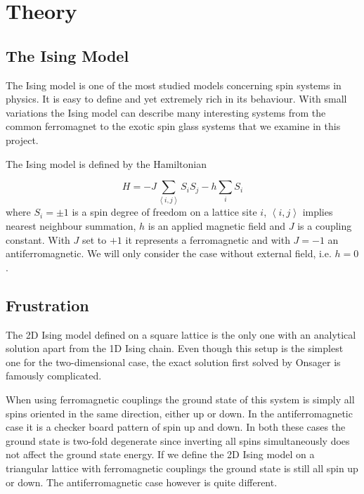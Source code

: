 \documentclass[paper=a4, fontsize=11pt]{scrartcl} %
\numberwithin{equation}{section} %
\numberwithin{figure}{section} %
\numberwithin{table}{section} %
\begin{document}
\section{Theory}
\label{sec:theory}

\subsection{The Ising Model}

The Ising model is one of the most studied models concerning spin systems in physics. It is easy to define and yet extremely rich in its behaviour. With small variations the Ising model can describe many interesting systems from the common ferromagnet to the exotic spin glass systems that we examine in this project.

The Ising model is defined by the Hamiltonian

\begin{equation}
H = -J \sum\limits_{\left\langle i,j \right\rangle} S_{i} S_{j} -h \sum\limits_{i} S_{i}
\end{equation}
where $S_{i} = \pm 1$ is a spin degree of freedom on a lattice site $i$, $\left< i,j \right> $ implies nearest neighbour summation, $h$ is an applied magnetic field and $J$ is a coupling constant. With $J$ set to $+1$ it represents a ferromagnetic and with $J=-1$ an antiferromagnetic. We will only consider the case without external field, i.e. $h=0$.

\subsection{Frustration}
The 2D Ising model defined on a square lattice is the only one with an analytical solution apart from the 1D Ising chain. Even though this setup is the simplest one for the two-dimensional case, the exact solution first solved by Onsager is famously complicated\cite{onsager}.

When using ferromagnetic couplings the ground state of this system is simply all spins oriented in the same direction, either up or down. In the antiferromagnetic case it is a checker board pattern of spin up and down. In both these cases the ground state is two-fold degenerate since inverting all spins simultaneously does not affect the ground state energy. If we define the 2D Ising model on a triangular lattice with ferromagnetic couplings the ground state is still all spin up or down. The antiferromagnetic case however is quite different.
\end{document}
